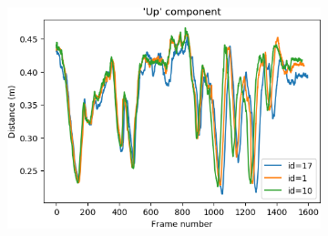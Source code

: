 \begin{figure}
    \centering
        \begin{subfigure}[b]{0.49\textwidth}
         \centering
         \includegraphics[width=\textwidth]{images/ellipse_sampling.csv_figure_u}
    \end{subfigure}


\end{figure}
